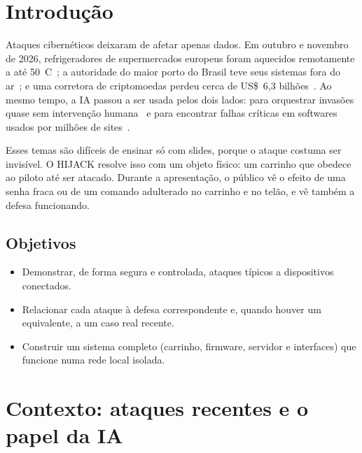\documentclass[12pt,openright,oneside,a4paper,english,brazil]{abntex2}
\begin{document}
\listoffigures*
\cleardoublepage

\listoftables*
\cleardoublepage

\tableofcontents*
\cleardoublepage

\textual

\chapter{Introdução}

Ataques cibernéticos deixaram de afetar apenas dados. Em outubro e novembro de 2026, refrigeradores de supermercados europeus foram aquecidos remotamente a até 50~\textdegree C~\cite{aljazeera-geladeiras,tecnoblog-geladeiras}; a autoridade do maior porto do Brasil teve seus sistemas fora do ar~\cite{sbt-santos}; e uma corretora de criptomoedas perdeu cerca de US\$~6,3 bilhões~\cite{reuters-binance}. Ao mesmo tempo, a IA passou a ser usada pelos dois lados: para orquestrar invasões quase sem intervenção humana~\cite{anthropic-gtg1002} e para encontrar falhas críticas em softwares usados por milhões de sites~\cite{wiz-php2shell}.

Esses temas são difíceis de ensinar só com slides, porque o ataque costuma ser invisível. O HIJACK resolve isso com um objeto físico: um carrinho que obedece ao piloto até ser atacado. Durante a apresentação, o público vê o efeito de uma senha fraca ou de um comando adulterado no carrinho e no telão, e vê também a defesa funcionando.

\section{Objetivos}

\begin{itemize}
  \item Demonstrar, de forma segura e controlada, ataques típicos a dispositivos conectados.
  \item Relacionar cada ataque à defesa correspondente e, quando houver um equivalente, a um caso real recente.
  \item Construir um sistema completo (carrinho, firmware, servidor e interfaces) que funcione numa rede local isolada.
\end{itemize}

\chapter{Contexto: ataques recentes e o papel da IA}\label{cap:contexto}
\end{document}
